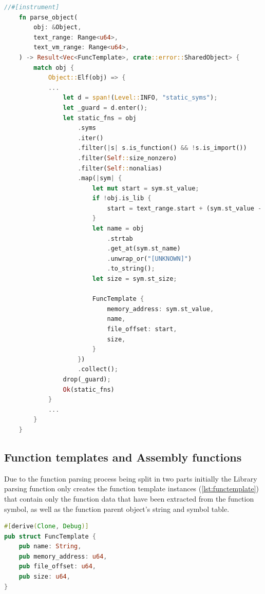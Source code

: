 \begin{lstlisting}[caption=\label{lst:so_parse_fn}{Function responsible for parsing object files}, language=Rust, breaklines=true]
//#[instrument]
    fn parse_object(
        obj: &Object,
        text_range: Range<u64>,
        text_vm_range: Range<u64>,
    ) -> Result<Vec<FuncTemplate>, crate::error::SharedObject> {
        match obj {
            Object::Elf(obj) => {
            ...
                let d = span!(Level::INFO, "static_syms");
                let _guard = d.enter();
                let static_fns = obj
                    .syms
                    .iter()
                    .filter(|s| s.is_function() && !s.is_import())
                    .filter(Self::size_nonzero)
                    .filter(Self::nonalias)
                    .map(|sym| {
                        let mut start = sym.st_value;
                        if !obj.is_lib {
                            start = text_range.start + (sym.st_value - text_vm_range.start);
                        }
                        let name = obj
                            .strtab
                            .get_at(sym.st_name)
                            .unwrap_or("[UNKNOWN]")
                            .to_string();
                        let size = sym.st_size;

                        FuncTemplate {
                            memory_address: sym.st_value,
                            name,
                            file_offset: start,
                            size,
                        }
                    })
                    .collect();
                drop(_guard);
                Ok(static_fns)
            }
            ...
        }
    }    
\end{lstlisting}

\subsection{Function templates and Assembly functions}

Due to the function parsing process being split in two parts initially the Library parsing function only creates the function template instances (\autoref{lst:functemplate}) that contain only the function data that have been extracted from the function symbol, as well as the function parent object's string and symbol table.
\begin{lstlisting}[caption=\label{lst:functemplate}{The Function template struct}, language=Rust]
#[derive(Clone, Debug)]
pub struct FuncTemplate {
    pub name: String,
    pub memory_address: u64,
    pub file_offset: u64,
    pub size: u64,
}
\end{lstlisting}

